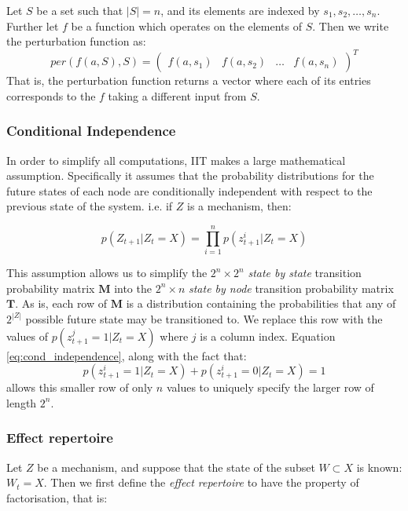 \begin{definition}
	{Let $S$ be a set such that $|S| = n$, and its elements are indexed by $s_1, s_2, \ldots, s_n$. Further let $f$ be a function which operates on the elements of $S$. Then we write the perturbation function as:
	\[per(f(a, S), S) = \left(\begin{array}{cccc}f(a,s_1)&f(a,s_2)&\ldots&f(a,s_n) \end{array}\right)^T\]
	That is, the perturbation function returns a vector where each of its entries corresponds to the $f$ taking a different input from $S$.}
\end{definition} 

\subsubsection{Conditional Independence}
In order to simplify all computations, IIT makes a large mathematical assumption. Specifically it assumes that the probability distributions for the future states of each node are conditionally independent with respect to the previous state of the system. i.e. if $Z$ is a mechanism, then:

\begin{equation}
\label{eq:cond_independence}
p(Z_{t+1}|Z_t = X) = \prod \limits_{i=1}^{n} p(z^i_{t+1}|Z_t=X)
\end{equation}

This assumption allows us to simplify the $2^n \times 2^n $ \textit{state by state} transition probability matrix $\mathbf{M}$ into the $2^n \times n$ \textit{state by node} transition probability matrix $\mathbf{T}$. As is, each row of $\mathbf{M}$ is a distribution containing the probabilities that any of $2^{|Z|}$ possible future state may be transitioned to. We replace this row with the values of $p(z^j_{t+1}=1|Z_t=X)$ where $j$ is a column index. Equation \ref{eq:cond_independence}, along with the fact that: \[p(z^i_{t+1}=1|Z_t=X)+p(z^i_{t+1} =0|Z_t=X) =1\]
allows this smaller row of only $n$ values to uniquely specify the larger row of length $2^n$.


\subsubsection{Effect repertoire}

Let $Z$ be a mechanism, and suppose that the state of the subset $W \subset X$ is known: $W_t = X$. Then we first define the \textit{effect repertoire} to have the property of factorisation, that is:


